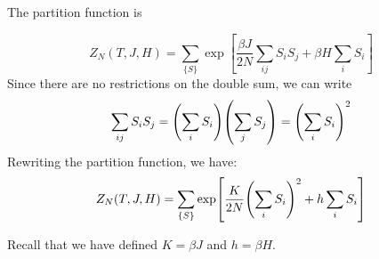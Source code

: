 \documentclass[../../Main/Main.tex]{subfiles}
\begin{document}













The partition function is

\begin{equation}
Z_N (T,J,H) = \sum_{\{ S \}  }^{} \exp [\frac{\beta J}{2N} \sum_{ij}^{} S_i S_j + \beta H \sum_{i}^{} S_i    ]
\end{equation}
Since there are no restrictions on the double sum, we can write
\begin{equation*}
  \sum_{ij}^{} S_i S_j  = \qty(\sum_{i}^{} S_i ) \qty(\sum_{j}^{} S_j )= \qty( \sum_{i}^{} S_i )^2
\end{equation*}
Rewriting the partition function, we have:
\begin{equation}
  Z_N (T,J,H)  =   \sum_{\{ S \}  }^{} \exp  [\frac{K}{2N} \qty( \sum_{i}^{} S_i )^2 + h \sum_{i}^{} S_i    ]
\end{equation}
\begin{remark}
Recall that we have defined \(K=\beta J\) and \( h = \beta H\).
\end{remark}
\end{document}
